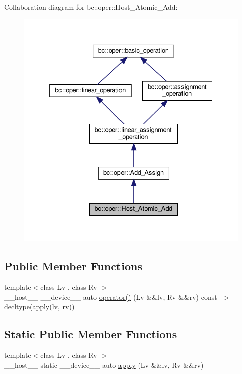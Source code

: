 Collaboration diagram for bc\+:\+:oper\+:\+:Host\+\_\+\+Atomic\+\_\+\+Add\+:\nopagebreak
\begin{figure}[H]
\begin{center}
\leavevmode
\includegraphics[width=332pt]{structbc_1_1oper_1_1Host__Atomic__Add__coll__graph}
\end{center}
\end{figure}
\subsection*{Public Member Functions}
\begin{DoxyCompactItemize}
\item 
{\footnotesize template$<$class Lv , class Rv $>$ }\\\+\_\+\+\_\+host\+\_\+\+\_\+ \+\_\+\+\_\+device\+\_\+\+\_\+ auto \hyperlink{structbc_1_1oper_1_1Host__Atomic__Add_a8d52bfde9f8437b8b36a87e8b7831557}{operator()} (Lv \&\&lv, Rv \&\&rv) const -\/$>$ decltype(\hyperlink{structbc_1_1oper_1_1Host__Atomic__Add_a95e2db6c170aec5d0eb6066cf74f32c2}{apply}(lv, rv))
\end{DoxyCompactItemize}
\subsection*{Static Public Member Functions}
\begin{DoxyCompactItemize}
\item 
{\footnotesize template$<$class Lv , class Rv $>$ }\\\+\_\+\+\_\+host\+\_\+\+\_\+ static \+\_\+\+\_\+device\+\_\+\+\_\+ auto \hyperlink{structbc_1_1oper_1_1Host__Atomic__Add_a95e2db6c170aec5d0eb6066cf74f32c2}{apply} (Lv \&\&lv, Rv \&\&rv)
\end{DoxyCompactItemize}
